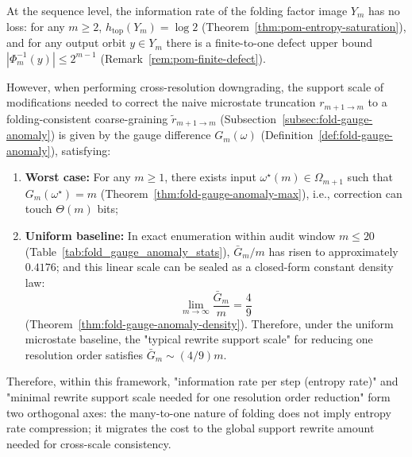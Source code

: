\begin{corollary}\label{cor:pom-two-axis-separation}
At the sequence level, the information rate of the folding factor image $Y_m$ has no loss: for any $m\ge 2$, $h_{\mathrm{top}}(Y_m)=\log 2$ (Theorem~\ref{thm:pom-entropy-saturation}), and for any output orbit $y\in Y_m$ there is a finite-to-one defect upper bound $|\Phi_m^{-1}(y)|\le 2^{m-1}$ (Remark~\ref{rem:pom-finite-defect}).
\par
However, when performing cross-resolution downgrading, the support scale of modifications needed to correct the naive microstate truncation $r_{m+1\to m}$ to a folding-consistent coarse-graining $\widetilde r_{m+1\to m}$ (Subsection~\ref{subsec:fold-gauge-anomaly}) is given by the gauge difference $G_m(\omega)$ (Definition~\ref{def:fold-gauge-anomaly}), satisfying:
\begin{enumerate}
  \item \textbf{Worst case:} For any $m\ge 1$, there exists input $\omega^\star(m)\in\Omega_{m+1}$ such that $G_m(\omega^\star)=m$ (Theorem~\ref{thm:fold-gauge-anomaly-max}), i.e., correction can touch $\Theta(m)$ bits;
  \item \textbf{Uniform baseline:} In exact enumeration within audit window $m\le 20$ (Table~\ref{tab:fold_gauge_anomaly_stats}), $\bar G_m/m$ has risen to approximately $0.4176$; and this linear scale can be sealed as a closed-form constant density law:
  \[
  \lim_{m\to\infty}\frac{\bar G_m}{m}=\frac{4}{9}
  \]
  (Theorem~\ref{thm:fold-gauge-anomaly-density}). Therefore, under the uniform microstate baseline, the "typical rewrite support scale" for reducing one resolution order satisfies $\bar G_m\sim (4/9)m$.
\end{enumerate}
Therefore, within this framework, "information rate per step (entropy rate)" and "minimal rewrite support scale needed for one resolution order reduction" form two orthogonal axes: the many-to-one nature of folding does not imply entropy rate compression; it migrates the cost to the global support rewrite amount needed for cross-scale consistency.
\end{corollary}

